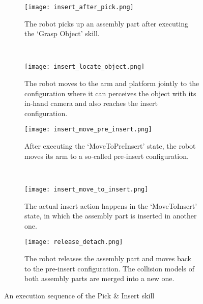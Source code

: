 \begin{figure}[!htbp]
\captionsetup[subfigure]{position=b}
    \centering
    \begin{subfigure}[t]{0.45\textwidth}
        \texttt{[image: insert\_after\_pick.png]}
        \caption{The robot picks up an assembly part after executing the `Grasp Object' skill.}
        \label{fig:insert_after_pick}
    \end{subfigure}
    ~
    \begin{subfigure}[t]{0.45\textwidth}
        \texttt{[image: insert\_locate\_object.png]}
        \caption{The robot moves to the arm and platform jointly to the configuration where it can perceives the object with its in-hand camera and also reaches the insert configuration.}
        \label{fig:insert_locate_object}
    \end{subfigure}
    
    \begin{subfigure}[t]{0.45\textwidth}
        \texttt{[image: insert\_move\_pre\_insert.png]}
        \caption{After executing the `MoveToPreInsert' state, the robot moves its arm to a so-called pre-insert configuration.}
        \label{fig:insert_move_pre_insert}
    \end{subfigure}
    ~
    \begin{subfigure}[t]{0.45\textwidth}
        \texttt{[image: insert\_move\_to\_insert.png]}
        \caption{The actual insert action happens in the `MoveToInsert' state, in which the assembly part is inserted in another one.}
        \label{fig:insert_move_to_insert}
    \end{subfigure}
      
    \begin{subfigure}[t]{0.45\textwidth}
        \texttt{[image: release\_detach.png]}
        \caption{The robot releases the assembly part and moves back to the pre-insert configuration. The collision models of both assembly parts are merged into a new one.}
        \label{fig:release_detach}
    \end{subfigure}
    \caption{An execution sequence of the Pick \& Insert skill}\label{fig:example_pick_and_insert}
\end{figure} 





